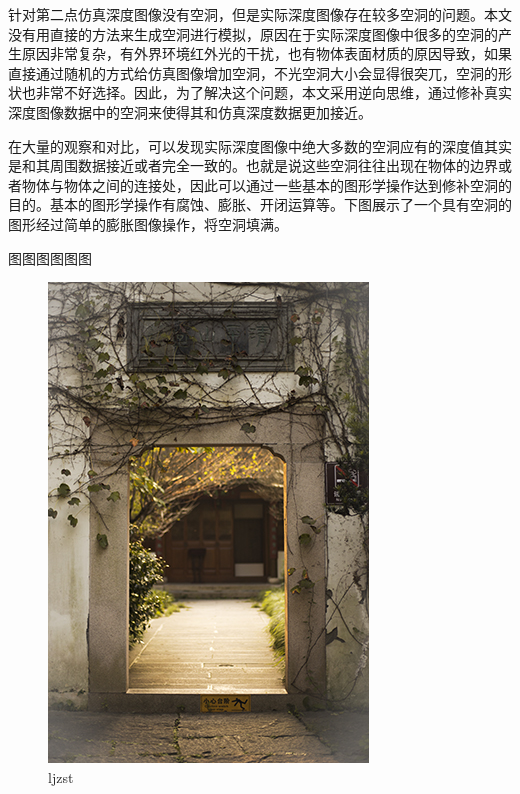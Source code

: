 针对第二点仿真深度图像没有空洞，但是实际深度图像存在较多空洞的问题。本文没有用直接的方法来生成空洞进行模拟，原因在于实际深度图像中很多的空洞的产生原因非常复杂，有外界环境红外光的干扰，也有物体表面材质的原因导致，如果直接通过随机的方式给仿真图像增加空洞，不光空洞大小会显得很突兀，空洞的形状也非常不好选择。因此，为了解决这个问题，本文采用逆向思维，通过修补真实深度图像数据中的空洞来使得其和仿真深度数据更加接近。

在大量的观察和对比，可以发现实际深度图像中绝大多数的空洞应有的深度值其实是和其周围数据接近或者完全一致的。也就是说这些空洞往往出现在物体的边界或者物体与物体之间的连接处，因此可以通过一些基本的图形学操作达到修补空洞的目的。基本的图形学操作有腐蚀、膨胀、开闭运算等。下图展示了一个具有空洞的图形经过简单的膨胀图像操作，将空洞填满。

图图图图图图
\begin{figure}[htb]
	\centering 
	\includegraphics[scale=1.0]{./Pictures/test.jpg} 
	\caption{ljzst} 
\end{figure}

